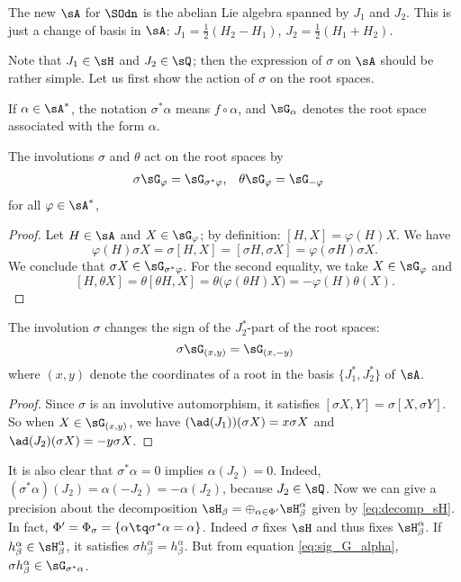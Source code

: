 \begin{remark}
The new $\sA$ for $\SOdn$ is the abelian Lie algebra spanned by $J_1$ and $J_2$. This is just a change of basis in $\sA$: $J_1=\frac{1}{2}(H_2-H_1)$, $J_2=\frac{1}{2}(H_1+H_2)$. 
\end{remark}
Note that $J_1\in\sH$ and $J_2\in\sQ$; then the expression of $\sigma$ on $\sA$ should be rather simple. Let us first show the action of $\sigma$ on the root spaces.

If $\alpha\in\sA^*$, the notation $\sigma^*\alpha$ means $f\circ\alpha$, and $\sG_{\alpha}$ denotes the root space associated with the form $\alpha$.

\begin{lemma}			\label{LemSigmaThetaRootSpaces}
	The involutions $\sigma$ and $\theta$ act on the root spaces by 
	\begin{align}		\label{eq:sig_G_alpha}
		\sigma\sG_{\varphi}&=\sG_{\sigma^*\varphi},
		&\theta\sG_{\varphi}&=\sG_{-\varphi}
	\end{align}
	for all $\varphi\in\sA^*$,
\end{lemma}

\begin{proof}
Let $H\in \sA$ and $X\in\sG_{\varphi}$; by definition: $[H,X]=\varphi(H)X$. We have
\[ 
  \varphi(H)\sigma X=\sigma[H,X]=[\sigma H,\sigma X]=\varphi(\sigma H)\sigma X.
\]
We conclude that $\sigma X\in\sG_{\sigma^*\varphi}$. For the second equality, we take $X\in\sG_{\varphi}$ and 
\[ 
  [H,\theta X]=\theta[\theta H,X]=\theta\big( \varphi(\theta H)X \big)=-\varphi(H)\theta(X).
\]
\end{proof}

\begin{lemma}		\label{LemSigmaChangeDeux}
The involution $\sigma$ changes the sign of the $J_{2}^*$-part of the root spaces:
\[
	\sigma\sG_{(x,y)}=\sG_{(x,-y)}
\]
where $(x,y)$ denote the coordinates of a root in the basis $\{ J_1^*,J_2^* \}$ of $\sA$.
\end{lemma}

\begin{proof}
Since $\sigma$ is an involutive automorphism, it satisfies $[\sigma X,Y]=\sigma[X,\sigma Y]$. So when $X\in\sG_{(x,y)}$, we have $(\ad(J_{1}))(\sigma X)=x\sigma X$ and $\ad(J_{2})(\sigma X)=-y\sigma X$.

\end{proof}

It is also clear that $\sigma^*\alpha=0$ implies $\alpha(J_2)=0$. Indeed, $(\sigma^*\alpha)(J_2)=\alpha(-J_2) =-\alpha(J_2)$, because $J_{2}\in\sQ$.
Now we can give a precision about the decomposition $\sH_{\beta}=\oplus_{\alpha\in\Phi'}\sH_{\beta}^{\alpha}$ given by \eqref{eq:decomp_sH}. In fact, $\Phi'=\Phi_{\sigma}=\{\alpha\tq \sigma^*\alpha=\alpha\}$. Indeed $\sigma$ fixes $\sH$ and thus fixes $\sH_{\beta}^{\alpha}$. If $h_{\beta}^{\alpha}\in\sH_{\beta}^{\alpha}$, it satisfies $\sigma h_{\beta}^{\alpha}=h_{\beta}^{\alpha}$. But from equation \eqref{eq:sig_G_alpha}, $\sigma h_{\beta}^{\alpha}\in \sG_{\sigma^*\alpha}$.

